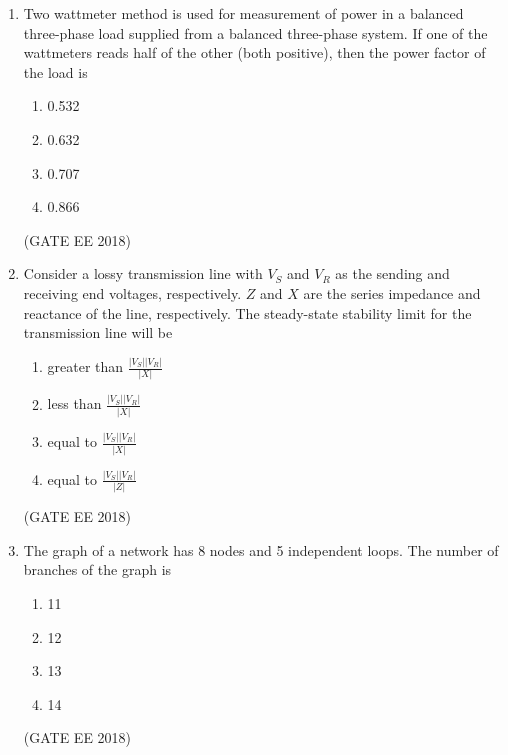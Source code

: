\documentclass[journal,12pt,onecolumn]{IEEEtran}
\theoremstyle{remark}
\begin{document}
\begin{enumerate}
\begin{figure}[H]
    \caption{}
    \label{fig:2}
\end{figure}
\begin{multicols}{2}
    \begin{enumerate}
        \item Triac only
        \item Triac and MOSFET
        \item Triac and GTO
        \item Thyristor and Triac
    \end{enumerate}
    \end{multicols}
\hfill{(GATE EE 2018)}

    \item Two wattmeter method is used for measurement of power in a balanced three-phase load supplied from a balanced three-phase system. If one of the wattmeters reads half of the other (both positive), then the power factor of the load is
    \begin{multicols}{4}
    \begin{enumerate}
        \item 0.532
        \item 0.632
        \item 0.707
        \item 0.866
    \end{enumerate}
    \end{multicols}
\hfill{(GATE EE 2018)}

    \item Consider a lossy transmission line with $V_{S}$ and $V_{R}$ as the sending and receiving end voltages, respectively. $Z$ and $X$ are the series impedance and reactance of the line, respectively. The steady-state stability limit for the transmission line will be
    \begin{enumerate}
        \item greater than $\frac{|V_{S}| |V_{R}|}{|X|}$
        \item less than $\frac{|V_{S}| |V_{R}|}{|X|}$
        \item equal to $\frac{|V_{S}| |V_{R}|}{|X|}$
        \item equal to $\frac{|V_{S}| |V_{R}|}{|Z|}$
    \end{enumerate}
\hfill{(GATE EE 2018)}

    \item The graph of a network has 8 nodes and 5 independent loops. The number of branches of the graph is
    \begin{multicols}{4}
    \begin{enumerate}
        \item 11
        \item 12
        \item 13
        \item 14
    \end{enumerate}
    \end{multicols}
\hfill{(GATE EE 2018)}


\end{enumerate}
\end{document}
